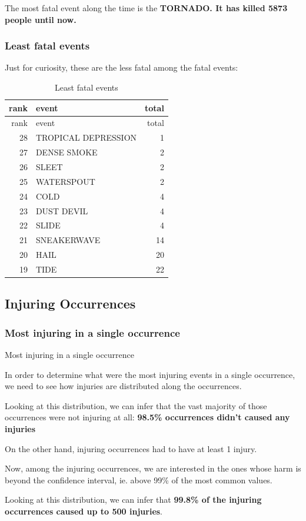 \documentclass[]{article}
\begin{document}
The most fatal event along the time is the \textbf{TORNADO. It has
killed 5873 people until now.}

\subsubsection{Least fatal events}\label{least-fatal-events}

Just for curiosity, these are the less fatal among the fatal events:

\begin{longtable}[]{@{}rlr@{}}
\caption{Least fatal events}\tabularnewline
\toprule
rank & event & total\tabularnewline
\midrule
\endfirsthead
\toprule
rank & event & total\tabularnewline
\midrule
\endhead
28 & TROPICAL DEPRESSION & 1\tabularnewline
27 & DENSE SMOKE & 2\tabularnewline
26 & SLEET & 2\tabularnewline
25 & WATERSPOUT & 2\tabularnewline
24 & COLD & 4\tabularnewline
23 & DUST DEVIL & 4\tabularnewline
22 & SLIDE & 4\tabularnewline
21 & SNEAKERWAVE & 14\tabularnewline
20 & HAIL & 20\tabularnewline
19 & TIDE & 22\tabularnewline
\bottomrule
\end{longtable}

\subsection{Injuring Occurrences}\label{injuring-occurrences}

\subsubsection{Most injuring in a single
occurrence}\label{most-injuring-in-a-single-occurrence}

Most injuring in a single occurrence

In order to determine what were the most injuring events in a single
occurrence, we need to see how injuries are distributed along the
occurrences.

Looking at this distribution, we can infer that the vast majority of
those occurrences were not injuring at all: \textbf{98.5\% occurrences
didn't caused any injuries}

On the other hand, injuring occurrences had to have at least 1 injury.

Now, among the injuring occurrences, we are interested in the ones whose
harm is beyond the confidence interval, ie. above 99\% of the most
common values.

Looking at this distribution, we can infer that \textbf{99.8\% of the
injuring occurrences caused up to 500 injuries}.
\end{document}
